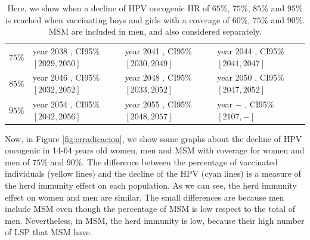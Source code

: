 \begin{table}[!h]
\begin{tabular}{c|lll}
$ 75 \%$ & year  2038 , CI95\% $[ 2029 , 2050 ]$ & year  2041 , CI95\% $[ 2030 , 2049 ]$ & year  2044 , CI95\% $[ 2041 , 2047 ]$ \\
$ 85 \%$ & year  2046 , CI95\% $[ 2032 , 2052 ]$ & year  2048 , CI95\% $[ 2033 , 2052 ]$ & year  2050 , CI95\% $[ 2047 , 2052 ]$ \\
$ 95 \%$ & year  2054 , CI95\% $[ 2042 , 2056 ]$ & year  2055 , CI95\% $[ 2048 , 2057 ]$ & year  $-$ , CI95\% $[ 2107 , - ]$
	\end{tabular} 
	\caption{Here, we show when a decline of HPV oncogenic HR of $65\%$, $75\%$, $85\%$ and $95\%$ is reached when vaccinating boys and girls with a coverage of $60\%$, $75\%$ and $90\%$. MSM are included in men, and also considered separately.}
	\label{tabla:decline_HR_onco}
\end{table}

Now, in Figure \ref{fig:erradicacion}, we show some graphs about the decline of HPV oncogenic in 14-64 years old women, men and MSM with coverage for women and men of $75\%$ and $90\%$. The difference between the percentage of vaccinated individuals (yellow lines) and the decline of the HPV (cyan lines) is a measure of the herd immunity effect on each population. As we can see, the herd immunity effect on women and men are similar. The small differences are because men include MSM even though the percentage of MSM is low respect to the total of men. Nevertheless, in MSM, the herd immunity is low, because their high number of LSP that MSM have.  

